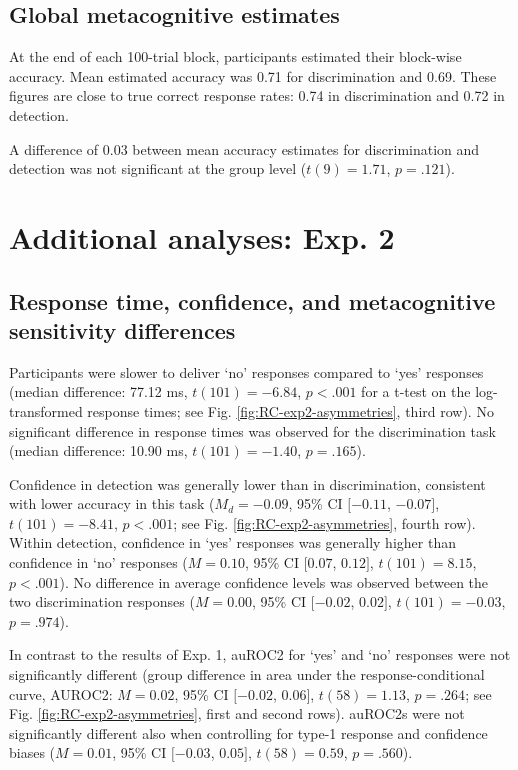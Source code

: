 \documentclass[12pt,twoside]{reedthesis}
\begin{document}
\hypertarget{global-metacognitive-estimates}{%
\subsection{Global metacognitive estimates}\label{global-metacognitive-estimates}}

At the end of each 100-trial block, participants estimated their block-wise accuracy. Mean estimated accuracy was 0.71 for discrimination and 0.69. These figures are close to true correct response rates: 0.74 in discrimination and 0.72 in detection.

A difference of 0.03 between mean accuracy estimates for discrimination and detection was not significant at the group level (\(t(9) = 1.71\), \(p = .121\)).

\hypertarget{additional-analyses-exp.-2}{%
\section{Additional analyses: Exp. 2}\label{additional-analyses-exp.-2}}

\hypertarget{appRC-asymmetries2}{%
\subsection{Response time, confidence, and metacognitive sensitivity differences}\label{appRC-asymmetries2}}

Participants were slower to deliver `no' responses compared to `yes' responses (median difference: 77.12 ms, \(t(101) = -6.84\), \(p < .001\) for a t-test on the log-transformed response times; see Fig. \ref{fig:RC-exp2-asymmetries}, third row). No significant difference in response times was observed for the discrimination task (median difference: 10.90 ms, \(t(101) = -1.40\), \(p = .165\)).

Confidence in detection was generally lower than in discrimination, consistent with lower accuracy in this task (\(M_d = -0.09\), 95\% CI \([-0.11\), \(-0.07]\), \(t(101) = -8.41\), \(p < .001\); see Fig. \ref{fig:RC-exp2-asymmetries}, fourth row). Within detection, confidence in `yes' responses was generally higher than confidence in `no' responses (\(M = 0.10\), 95\% CI \([0.07\), \(0.12]\), \(t(101) = 8.15\), \(p < .001\)). No difference in average confidence levels was observed between the two discrimination responses (\(M = 0.00\), 95\% CI \([-0.02\), \(0.02]\), \(t(101) = -0.03\), \(p = .974\)).

In contrast to the results of Exp. 1, auROC2 for `yes' and `no' responses were not significantly different (group difference in area under the response-conditional curve, AUROC2: \(M = 0.02\), 95\% CI \([-0.02\), \(0.06]\), \(t(58) = 1.13\), \(p = .264\); see Fig. \ref{fig:RC-exp2-asymmetries}, first and second rows). auROC2s were not significantly different also when controlling for type-1 response and confidence biases (\(M = 0.01\), 95\% CI \([-0.03\), \(0.05]\), \(t(58) = 0.59\), \(p = .560\)).
\end{document}
